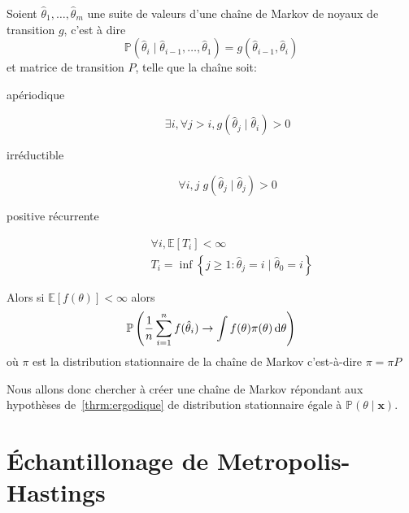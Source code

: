 \begin{theoreme}\label{thrm:ergodique}
    Soient $\hat{\theta}_1,\dotsc,\hat{\theta}_m$ une suite de valeurs d'une chaîne de Markov de noyaux de transition $g$, c'est à dire 
    \begin{equation*}
        \mathbb{P} \left( \hat{\theta}_i \mid \hat{\theta}_{i-1},\dotsc,\hat{\theta}_1 \right) = g ( \hat{\theta}_{i-1} , \hat{\theta}_i )
    \end{equation*}
    et matrice de transition $P$, telle que la chaîne soit:
    \begin{description}
        \item[apériodique] \begin{equation*}
                \exists i , \forall j > i,  g \left( \hat{\theta}_j \mid \hat{\theta}_i \right) > 0
            \end{equation*}
        \item[irréductible] \begin{equation*}
                \forall i,j \; g \left( \hat{\theta}_j \mid \hat{\theta}_j \right) > 0
            \end{equation*}
        \item[positive récurrente] \begin{align*}
            &\forall i , \mathbb{E} \left[ T_i \right] < \infty \\
            &T_i = \inf \left\{ j \geq 1 : \hat{\theta}_j = i \mid \hat{\theta}_0 = i \right\}
        \end{align*}
    \end{description}
    Alors si $\mathbb{E} \left[ f(\theta) \right] < \infty$ alors
    \begin{equation*}
        \mathbb{P} \left( \frac{1}{n} \sum_{i=1}^n f(\hat{\theta}_i) \to \int f(\theta) \pi ( \theta ) \mathop{}\!\mathrm{d} \theta \right)
    \end{equation*}
    où $\pi$ est la distribution stationnaire de la chaîne de Markov c'est-à-dire $\pi = \pi P$
\end{theoreme}

Nous allons donc chercher à créer une chaîne de Markov répondant aux hypothèses de~\ref{thrm:ergodique} de distribution stationnaire égale à $\mathbb{P} (\theta \mid \mathbf{x})$.

\section{Échantillonage de Metropolis-Hastings}\label{sec:metropolis.hastings}

